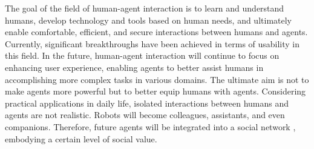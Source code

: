 The goal of the field of human-agent interaction is to learn and understand humans, develop technology and tools based on human needs, and ultimately enable comfortable, efficient, and secure interactions between humans and agents. Currently, significant breakthroughs have been achieved in terms of usability in this field. In the future, human-agent interaction will continue to focus on enhancing user experience, enabling agents to better assist humans in accomplishing more complex tasks in various domains. The ultimate aim is not to make agents more powerful but to better equip humans with agents. Considering practical applications in daily life, isolated interactions between humans and agents are not realistic. Robots will become colleagues, assistants, and even companions. Therefore, future agents will be integrated into a social network \cite{DBLP:journals/ijsr/AbramsP20}, embodying a certain level of social value.